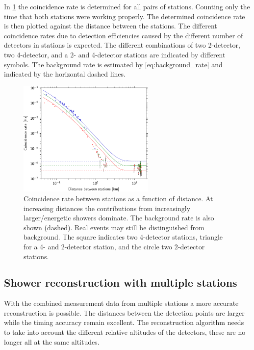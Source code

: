 In \cref{fig:distance_v_coincidence_rate} the coincidence rate is determined for all pairs of stations. Counting only the time that both stations were working properly. The determined coincidence rate is then plotted against the distance between the stations. The different coincidence rates due to detection efficiencies caused by the different number of detectors in stations is expected. The different combinations of two 2-detector, two 4-detector, and a 2- and 4-detector stations are indicated by different symbols. The background rate is estimated by \cref{eq:background_rate} and indicated by the horizontal dashed lines.

\begin{figure}
    \centering
    \includegraphics[width=0.6\textwidth]
                    {plots/experiment/distance_v_coincidence_rate}
    \caption{Coincidence rate between stations as a function of distance. At increasing distances the contributions from increasingly larger/energetic showers dominate. The background rate is also shown (dashed). Real events may still be distinguished from background. The square indicates two 4-detector stations, triangle for a 4- and 2-detector station, and the circle two 2-detector stations.}
    \label{fig:distance_v_coincidence_rate}
\end{figure}

\subsection{Shower reconstruction with multiple stations}

With the combined measurement data from multiple stations a more accurate reconstruction is possible. The distances between the detection points are larger while the timing accuracy remain excellent. The reconstruction algorithm needs to take into account the different relative altitudes of the detectors, these are no longer all at the same altitudes.

